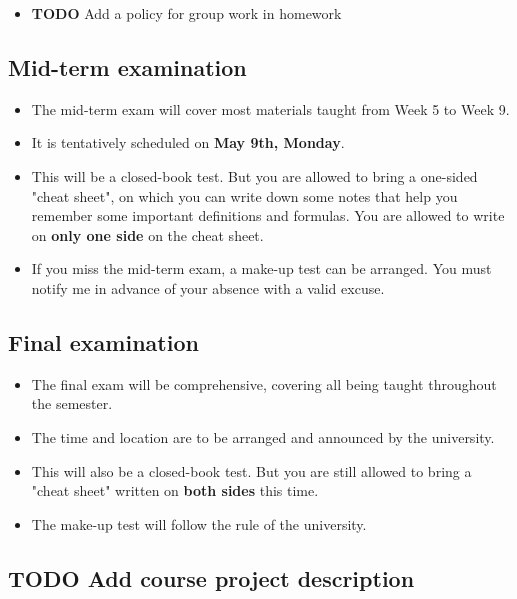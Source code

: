\documentclass[a4paper,11pt]{article}
\begin{document}
\begin{itemize}
\item {\bfseries\sffamily TODO} Add a policy for group work in homework
\label{sec:orgc4fe5d8}
\end{itemize}


\subsection*{Mid-term examination}
\label{sec:org5be3276}

\begin{itemize}
\item The mid-term exam will cover most materials taught from Week 5 to
Week 9.
\item It is tentatively scheduled on \textbf{May 9th, Monday}.
\item This will be a closed-book test. But you are allowed to bring a
one-sided "cheat sheet", on which you can write down some notes that
help you remember some important definitions and formulas. You are
allowed to write on \textbf{only one side} on the cheat sheet.
\item If you miss the mid-term exam, a make-up test can be arranged. You
must notify me in advance of your absence with a valid excuse.
\end{itemize}


\subsection*{Final examination}
\label{sec:org6426d94}

\begin{itemize}
\item The final exam will be comprehensive, covering all being taught
throughout the semester.
\item The time and location are to be arranged and announced by the
university.
\item This will also be a closed-book test. But you are still allowed to
bring a "cheat sheet" written on \textbf{both sides} this time.
\item The make-up test will follow the rule of the university.
\end{itemize}


\subsection*{{\bfseries\sffamily TODO} Add course project description}
\label{sec:org24255ff}
\end{document}
